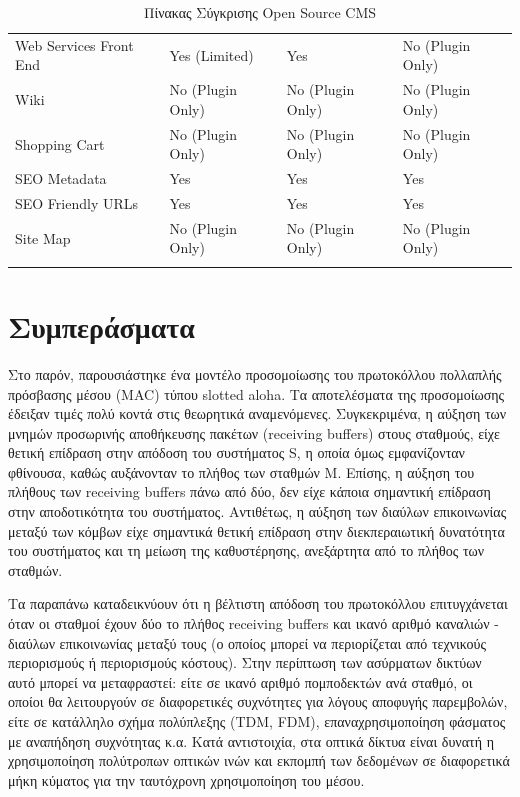 \documentclass[12pt]{report}
\begin{document}
\begin{longtable}[H]{|| p{.3\linewidth} | p{.19\linewidth} | p{.19\linewidth} | p{.19\linewidth} ||}
Web Services Front End & Yes (Limited) & Yes & No (Plugin Only) \\
Wiki & No (Plugin Only) & No (Plugin Only) & No (Plugin Only) \\
Shopping Cart & No (Plugin Only) & No (Plugin Only) & No (Plugin Only) \\
SEO Metadata & Yes & Yes & Yes \\
SEO Friendly URLs & Yes & Yes & Yes \\
Site Map & No (Plugin Only) & No (Plugin Only) & No (Plugin Only) \\
\hline
\caption{\textgreek{Πίνακας Σύγκρισης} Open Source CMS}
\label{tab01}
\end{longtable}
\normalsize
{}

\section{Συμπεράσματα}
Στο παρόν, παρουσιάστηκε ένα μοντέλο προσομοίωσης του πρωτοκόλλου πολλαπλής πρόσβασης μέσου (\textlatin{MAC}) τύπου \textlatin{slotted aloha}. Τα αποτελέσματα της προσομοίωσης έδειξαν τιμές πολύ κοντά στις θεωρητικά αναμενόμενες. Συγκεκριμένα, η αύξηση των μνημών προσωρινής αποθήκευσης πακέτων (\textlatin{receiving buffers}) στους σταθμούς, είχε θετική επίδραση στην απόδοση του συστήματος \textlatin{S}, η οποία όμως εμφανίζονταν φθίνουσα, καθώς αυξάνονταν το πλήθος των σταθμών \textlatin{M}. Επίσης, η αύξηση του πλήθους των \textlatin{receiving buffers} πάνω από δύο, δεν είχε κάποια σημαντική επίδραση στην αποδοτικότητα του συστήματος. Αντιθέτως, η αύξηση των διαύλων επικοινωνίας μεταξύ των κόμβων είχε σημαντικά θετική επίδραση στην διεκπεραιωτική δυνατότητα του συστήματος και τη μείωση της καθυστέρησης, ανεξάρτητα από το πλήθος των σταθμών.

Τα παραπάνω καταδεικνύουν ότι η βέλτιστη απόδοση του πρωτοκόλλου επιτυγχάνεται όταν οι σταθμοί έχουν δύο το πλήθος \textlatin{receiving buffers} και ικανό αριθμό καναλιών - διαύλων επικοινωνίας μεταξύ τους (ο οποίος μπορεί να περιορίζεται από τεχνικούς περιορισμούς ή περιορισμούς κόστους). Στην περίπτωση των ασύρματων δικτύων αυτό μπορεί να μεταφραστεί: είτε σε ικανό αριθμό πομποδεκτών ανά σταθμό, οι οποίοι θα λειτουργούν σε διαφορετικές συχνότητες για λόγους αποφυγής παρεμβολών, είτε σε κατάλληλο σχήμα πολύπλεξης (\textlatin{TDM, FDM}), επαναχρησιμοποίηση φάσματος με αναπήδηση συχνότητας κ.α. Κατά αντιστοιχία, στα οπτικά δίκτυα είναι δυνατή η χρησιμοποίηση πολύτροπων οπτικών ινών και εκπομπή των δεδομένων σε διαφορετικά μήκη κύματος για την ταυτόχρονη χρησιμοποίηση του μέσου.

\begin{appendices}

\end{appendices}

\appendix



\end{document}
